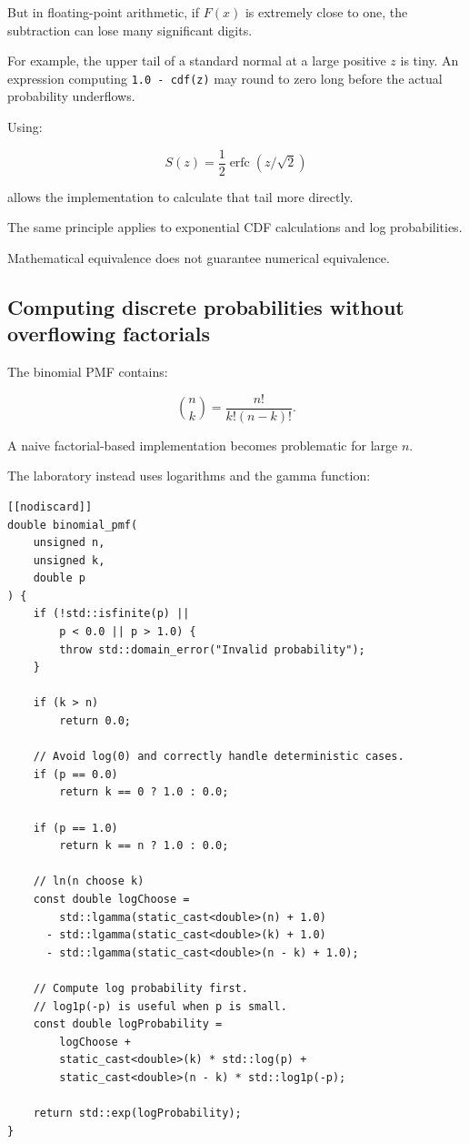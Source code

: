 But in floating-point arithmetic, if \(F(x)\) is extremely close to one, the subtraction can lose many significant digits.

For example, the upper tail of a standard normal at a large positive \(z\) is tiny. An expression computing \texttt{1.0\ -\ cdf(z)} may round to zero long before the actual probability underflows.

Using:

\[
 S(z)=\frac12\operatorname{erfc}(z/\sqrt2)
\]

allows the implementation to calculate that tail more directly.

The same principle applies to exponential CDF calculations and log probabilities.

Mathematical equivalence does not guarantee numerical equivalence.

\subsection{Computing discrete probabilities without overflowing factorials}\label{02-foundations-ii-ch031-computing-discrete-probabilities-without-overflowing-factorials}

\hypertarget{02-foundations-ii-ch031-computing-discrete-probabilities-without-overflowing-factorials}{}

The binomial PMF contains:

\[
 \binom nk= \frac{n!}{k!(n-k)!}.
\]

A naive factorial-based implementation becomes problematic for large \(n\).

The laboratory instead uses logarithms and the gamma function:

\begin{verbatim}
[[nodiscard]]
double binomial_pmf(
    unsigned n,
    unsigned k,
    double p
) {
    if (!std::isfinite(p) ||
        p < 0.0 || p > 1.0) {
        throw std::domain_error("Invalid probability");
    }

    if (k > n)
        return 0.0;

    // Avoid log(0) and correctly handle deterministic cases.
    if (p == 0.0)
        return k == 0 ? 1.0 : 0.0;

    if (p == 1.0)
        return k == n ? 1.0 : 0.0;

    // ln(n choose k)
    const double logChoose =
        std::lgamma(static_cast<double>(n) + 1.0)
      - std::lgamma(static_cast<double>(k) + 1.0)
      - std::lgamma(static_cast<double>(n - k) + 1.0);

    // Compute log probability first.
    // log1p(-p) is useful when p is small.
    const double logProbability =
        logChoose +
        static_cast<double>(k) * std::log(p) +
        static_cast<double>(n - k) * std::log1p(-p);

    return std::exp(logProbability);
}
\end{verbatim}

